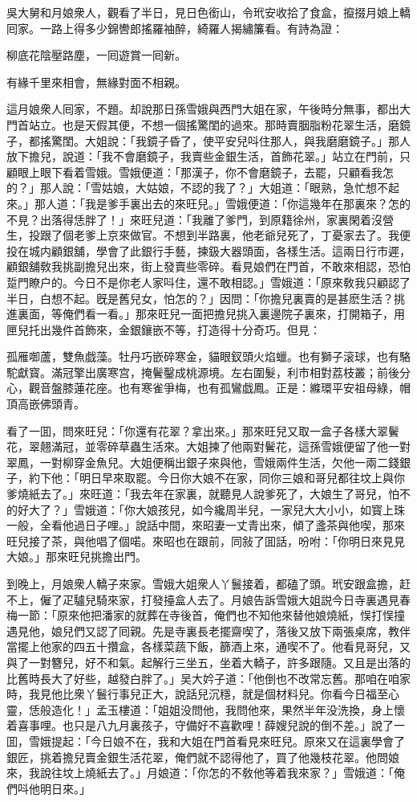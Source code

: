 吳大舅和月娘衆人，觀看了半日，見日色銜山，令玳安收拾了食盒，攛掇月娘上轎囘家。一路上得多少錦轡郎搖羅袖醉，綺羅人揭繡簾看。有詩為證：

柳底花陰壓路塵，一囘遊賞一囘新。

有緣千里來相會，無緣對面不相親。

這月娘衆人囘家，不題。却說那日孫雪娥與西門大姐在家，午後時分無事，都出大門首站立。也是天假其便，不想一個搖驚閨的過來。那時賣胭脂粉花翠生活，磨鏡子，都搖驚閨。大姐說：「我鏡子昏了，使平安兒呌住那人，與我磨磨鏡子。」那人放下擔兒，說道：「我不會磨鏡子，我賣些金銀生活，首飾花翠。」站立在門前，只顧眼上眼下看着雪娥。雪娥便道：「那漢子，你不會磨鏡子，去罷，只顧看我怎的？」那人說：「雪姑娘，大姑娘，不認的我了？」大姐道：「眼熟，急忙想不起來。」那人道：「我是爹手裏出去的來旺兒。」雪娥便道：「你這幾年在那裏來？怎的不見？出落得恁胖了！」來旺兒道：「我離了爹門，到原籍徐州，家裏閑着沒營生，投跟了個老爹上京來做官。不想到半路裏，他老爺兒死了，丁憂家去了。我便投在城内顧銀舖，學會了此銀行手藝，揀鈒大器頭面，各樣生活。這兩日行市遲，顧銀舖敎我挑副擔兒出來，街上發賣些零碎。看見娘們在門首，不敢來相認，恐怕踅門瞭户的。今日不是你老人家呌住，還不敢相認。」雪娥道：「原來敎我只顧認了半日，白想不起。旣是舊兒女，怕怎的？」因問：「你擔兒裏賣的是甚麽生活？挑進裏面，等俺們看一看。」那來旺兒一面把擔兒挑入裏邊院子裏來，打開箱子，用匣兒托出幾件首飾來，金銀鑲嵌不等，打造得十分奇巧。但見：

孤雁啣蘆，雙魚戯藻。牡丹巧嵌碎寒金，貓眼釵頭火焰蠟。也有獅子滚球，也有駱駝獻寳。滿冠擎出廣寒宫，掩鬢鑿成桃源境。左右圍髮，利市相對荔枝叢；前後分心，觀音盤膝蓮花座。也有寒雀爭梅，也有孤鸞戯鳳。正是：縧環平安祖母綠，帽頂高嵌佛頭青。

看了一囬，問來旺兒：「你還有花翠？拿出來。」那來旺兒又取一盒子各樣大翠鬢花，翠翹滿冠，並零碎草蟲生活來。大姐揀了他兩對鬢花，這孫雪娥便留了他一對翠鳳，一對柳穿金魚兒。大姐便稱出銀子來與他，雪娥兩件生活，欠他一兩二錢銀子，約下他：「明日早來取罷。今日你大娘不在家，同你三娘和哥兒都往坟上與你爹燒紙去了。」來旺道：「我去年在家裏，就聽見人說爹死了，大娘生了哥兒，怕不的好大了？」雪娥道：「你大娘孩兒，如今纔周半兒，一家兒大大小小，如寳上珠一般，全看他過日子哩。」說話中間，來昭妻一丈青出來，傾了盞茶與他喫，那來旺兒接了茶，與他唱了個喏。來昭也在跟前，同敍了囬話，吩咐：「你明日來見見大娘。」那來旺兒挑擔出門。

到晚上，月娘衆人轎子來家。雪娥大姐衆人丫鬟接着，都磕了頭。玳安跟盒擔，赶不上，僱了疋驢兒騎來家，打發擡盒人去了。月娘告訴雪娥大姐説今日寺裏遇見春梅一節：「原來他把潘家的就葬在寺後首，俺們也不知他來替他娘燒紙，悮打悮撞遇見他，娘兒們又認了囘親。先是寺裏長老擺齋喫了，落後又放下兩張桌席，教伴當擺上他家的四五十攢盒，各樣菜蔬下飯，篩酒上來，通喫不了。他看見哥兒，又與了一對簪兒，好不和氣。起解行三坐五，坐着大轎子，許多跟隨。又且是出落的比舊時長大了好些，越發白胖了。」吴大妗子道：「他倒也不改常忘舊。那咱在咱家時，我見他比衆丫鬟行事兒正大，說話兒沉穩，就是個材料兒。你看今日福至心靈，恁般造化！」孟玉樓道：「姐姐没問他，我問他來，果然半年没洗換，身上懷着喜事哩。也只是八九月裏孩子，守備好不喜歡哩！薛嫂兒說的倒不差。」說了一囬，雪娥提起：「今日娘不在，我和大姐在門首看見來旺兒。原來又在這裏學會了銀匠，挑着擔兒賣金銀生活花翠，俺們就不認得他了，買了他幾枝花翠。他問娘來，我說往坟上燒紙去了。」月娘道：「你怎的不敎他等着我來家？」雪娥道：「俺們呌他明日來。」

